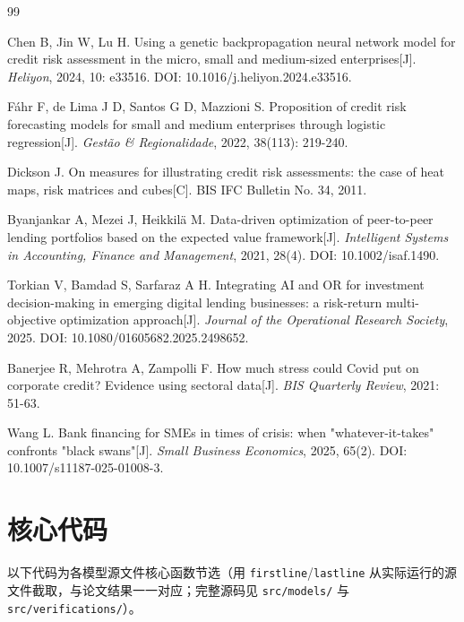 \documentclass[12pt, a4paper]{article}
\begin{document}
\begin{thebibliography}{99}

Chen B, Jin W, Lu H. Using a genetic backpropagation neural network model for credit risk assessment in the micro, small and medium-sized enterprises[J]. \textit{Heliyon}, 2024, 10: e33516. DOI: 10.1016/j.heliyon.2024.e33516.

Fáhr F, de Lima J D, Santos G D, Mazzioni S. Proposition of credit risk forecasting models for small and medium enterprises through logistic regression[J]. \textit{Gestão \& Regionalidade}, 2022, 38(113): 219-240.

Dickson J. On measures for illustrating credit risk assessments: the case of heat maps, risk matrices and cubes[C]. BIS IFC Bulletin No. 34, 2011.

Byanjankar A, Mezei J, Heikkilä M. Data-driven optimization of peer-to-peer lending portfolios based on the expected value framework[J]. \textit{Intelligent Systems in Accounting, Finance and Management}, 2021, 28(4). DOI: 10.1002/isaf.1490.

Torkian V, Bamdad S, Sarfaraz A H. Integrating AI and OR for investment decision-making in emerging digital lending businesses: a risk-return multi-objective optimization approach[J]. \textit{Journal of the Operational Research Society}, 2025. DOI: 10.1080/01605682.2025.2498652.

Banerjee R, Mehrotra A, Zampolli F. How much stress could Covid put on corporate credit? Evidence using sectoral data[J]. \textit{BIS Quarterly Review}, 2021: 51-63.

Wang L. Bank financing for SMEs in times of crisis: when "whatever-it-takes" confronts "black swans"[J]. \textit{Small Business Economics}, 2025, 65(2). DOI: 10.1007/s11187-025-01008-3.

\end{thebibliography}

\appendix
\section{核心代码}

以下代码为各模型源文件核心函数节选（用 \texttt{firstline}/\texttt{lastline} 从实际运行的源文件截取，与论文结果一一对应；完整源码见 \texttt{src/models/} 与 \texttt{src/verifications/}）。
\end{document}
